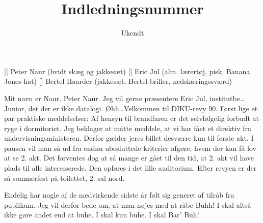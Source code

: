 \documentclass[a4paper,11pt]{article}
\title{Indledningsnummer}
\author{Ukendt}
\begin{document}
\maketitle

\begin{roles}
    [] Peter Naur (hvidt skæg og jakkesæt)
    [] Eric Jul (alm. lærertøj, pisk, Banana Jones-hat)
    [] Bertel Haarder (jakkesæt, Bertel-briller, nedskæringssværd)
\end{roles}


\begin{sketch}
 Mit navn er Naur. Peter Naur.
 Jeg vil gerne præsentere Eric Jul, institutbe\ldots
{}
  Junior, det der er ikke datalogi.
 Øhh\ldots Velkommen til DIKU-revy 90. Først lige et par praktiske meddelselser: Af hensyn til
         brandfaren er det selvfølgelig forbudt at ryge i dormitoriet.
         Jeg beklager at måtte meddele, at vi har fået et direktiv fra undervisningsministeren.
          Derfor gælder jeres billet desværre kun til første akt. I pausen vil man så
         ud fra endnu ubesluttede kriterier afgøre, hvem der kan få lov at se 2. akt.
         Det forventes dog at så mange er gået til den tid, at 2. akt vil have plads til alle interesserede.
         Den opføres i det lille auditorium. Efter revyen er der så sommerfest på toilettet, 2. sal nord.

         Endelig har nogle af de medvirkende sidste år følt sig generet af tilråb fra publikum. 
         Jeg vil derfor bede om, at man nøjes med at råbe Buhh! I skal altså ikke gøre andet end at buhe.
         I skal kun buhe. I skal  Bar' Buh!


\end{sketch}
\end{document}
